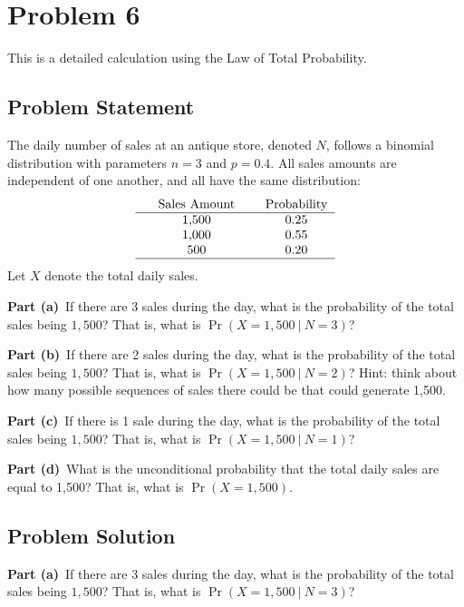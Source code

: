 \documentclass[12pt]{article}
\theoremstyle{definition}
\begin{document}
\newpage
\section*{Problem 6}

This is a detailed calculation using the Law of Total Probability.

\subsection*{Problem Statement}

The daily number of sales at an antique store, denoted $N$, follows a binomial distribution with parameters $n = 3$ and $p = 0.4$. All sales amounts are independent of one another, and all have the same distribution:
$$
\begin{tabular}{ccccc}
& Sales Amount & & Probability\\
\hline
& 1,500 & & 0.25\\
& 1,000 & & 0.55\\
& 500 & & 0.20\\
\hline
\end{tabular}
$$
Let $X$ denote the total daily sales.

\bigskip
\noindent
{\bf Part (a)}\ If there are 3 sales during the day, what is the probability of the total sales being $1,500$? That is, what is $\Pr(X = 1,500\ |\ N = 3)$?

\bigskip
\noindent
{\bf Part (b)}\ If there are 2 sales during the day, what is the probability of the total sales being $1,500$? That is, what is $\Pr(X = 1,500\ |\ N = 2)$? Hint: think about how many possible sequences of sales there could be that could generate 1,500.

\bigskip
\noindent
{\bf Part (c)}\ If there is 1 sale during the day, what is the probability of the total sales being $1,500$? That is, what is $\Pr(X = 1,500\ |\ N = 1)$?

\bigskip
\noindent
{\bf Part (d)}\ What is the unconditional probability that the total daily sales are equal to 1,500? That is, what is $\Pr(X = 1,500)$.


\newpage
\subsection*{Problem Solution}

\noindent
{\bf Part (a)}\ If there are 3 sales during the day, what is the probability of the total sales being $1,500$? That is, what is $\Pr(X = 1,500\ |\ N = 3)$?
\end{document}
